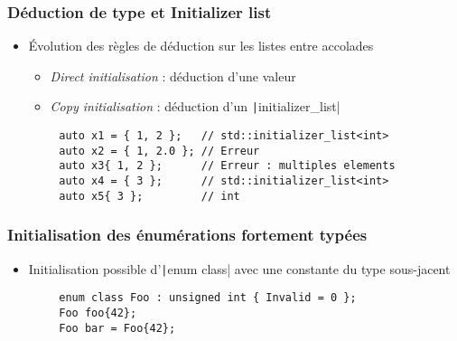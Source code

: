 \documentclass[C++.tex]{subfiles}
\begin{document}
\begin{frame}[fragile]
	\frametitle{Déduction de type et Initializer list}
	\begin{itemize}
		\item Évolution des règles de déduction sur les listes entre accolades
		\begin{itemize}
			\item \textit{Direct initialisation} : déduction d'une valeur


			\item \textit{Copy initialisation} : déduction d'un \texttt|initializer_list|

		\end{itemize}
	\end{itemize}

	\begin{verbatim}
		auto x1 = { 1, 2 };   // std::initializer_list<int>
		auto x2 = { 1, 2.0 }; // Erreur
		auto x3{ 1, 2 };      // Erreur : multiples elements
		auto x4 = { 3 };      // std::initializer_list<int>
		auto x5{ 3 };         // int
	\end{verbatim}

\end{frame}

\begin{frame}[fragile]
	\frametitle{Initialisation des énumérations fortement typées}
	\begin{itemize}
		\item Initialisation possible d'\texttt|enum class| avec une constante du type sous-jacent
	\end{itemize}

	\begin{verbatim}
		enum class Foo : unsigned int { Invalid = 0 };
		Foo foo{42};
		Foo bar = Foo{42};
	\end{verbatim}

\end{frame}
\end{document}
